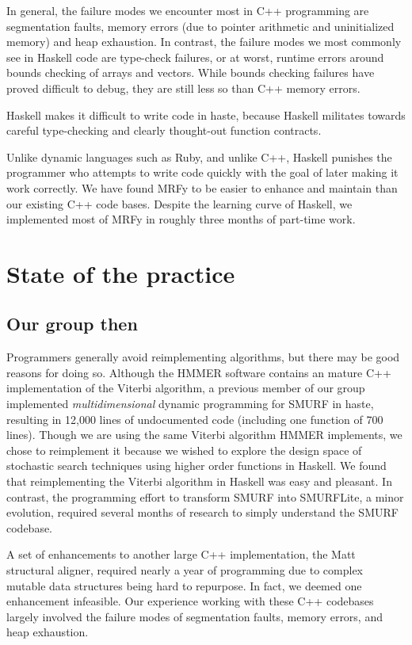 \documentclass[preprint,nonatbib,blockstyle,nocopyrightspace,times]{sigplanconf}
\let\cite\citep
\begin{document}
In general, the failure modes we encounter most in C++ programming are 
segmentation faults, memory errors (due to pointer arithmetic and uninitialized 
memory) and heap exhaustion.
In contrast, the failure modes we most commonly 
see in Haskell code are type-check failures, or at worst, runtime errors around 
bounds checking of arrays and vectors.
While bounds checking failures have 
proved difficult to debug, they are still less so than C++ memory errors.


Haskell makes it difficult to write code in haste, because Haskell militates 
towards careful type-checking and clearly thought-out function contracts.

Unlike dynamic languages such as Ruby, and unlike C++, Haskell punishes the 
programmer who attempts to write code quickly with the goal of later making it 
work correctly.
We have found MRFy to be easier to enhance and maintain than 
our existing C++ code bases.
Despite the learning curve of Haskell, we 
implemented most of MRFy in roughly three months of part-time work.

 
\section{State of the practice}

\subsection{Our group then}
Programmers generally avoid reimplementing algorithms, but there may be good reasons for doing so.
Although the HMMER software contains an mature C++ implementation of the Viterbi algorithm,
a previous member of our group implemented \textit{multidimensional} dynamic programming for SMURF
in haste, resulting in 12,000 lines of undocumented code (including one function of 700 lines).
Though we are using the same Viterbi algorithm HMMER implements, we chose to reimplement it because
we wished to explore the design space of stochastic search techniques using higher order functions
in Haskell.
We found that reimplementing the Viterbi algorithm in Haskell was easy and pleasant.
In contrast, the programming effort to transform SMURF into SMURFLite, a minor evolution, required
several months of research to simply understand the SMURF codebase.

A set of enhancements to another large C++ implementation, the Matt~\cite{Menke:2008wu} structural
aligner, required nearly a year of programming due to complex mutable data structures being 
hard to repurpose.
In fact, we deemed one enhancement infeasible.
Our experience working with these C++ codebases largely involved the failure modes of
segmentation faults, memory errors, and heap exhaustion.
\end{document}

